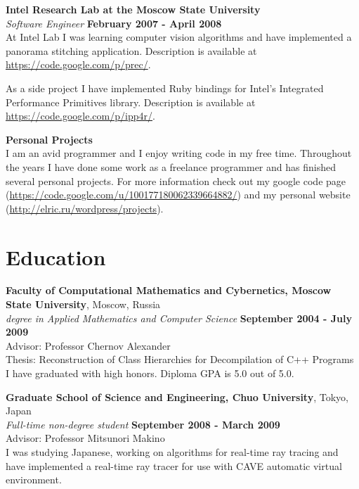 \documentclass[margin,line]{CV}
\begin{document}
\begin{resume}
    \pagebreak    
    
    \textbf{Intel Research Lab at the Moscow State University} \vspace{2mm}\\\vspace{1mm}%
    \textsl{Software Engineer} \hfill \textbf{February 2007 - April 2008}\\
    At Intel Lab I was learning computer vision algorithms and have implemented a panorama stitching application. Description is available at \url{https://code.google.com/p/prec/}.

    As a side project I have implemented Ruby bindings for Intel's Integrated Performance Primitives library. Description is available at \url{https://code.google.com/p/ipp4r/}.
    
    
	\textbf{Personal Projects} \vspace{2mm}\\\vspace{1mm}%
    I am an avid programmer and I enjoy writing code in my free time. Throughout the years I have done some work as a freelance programmer and has finished several personal projects. For more information check out my google code page (\url{https://code.google.com/u/100177180062339664882/}) and my personal website (\url{http://elric.ru/wordpress/projects}).
   
    
    \section{\mysidestyle Education}
    \textbf{Faculty of Computational Mathematics and Cybernetics, Moscow State University}, Moscow, Russia \vspace{2mm}\\\vspace{1mm}%
    \textsl{ degree in Applied Mathematics and Computer Science} \hfill \textbf{September 2004 - July 2009}\vspace{1mm}\\
    Advisor: Professor Chernov Alexander \\
    Thesis: Reconstruction of Class Hierarchies for Decompilation of C++ Programs \\
    I have graduated with high honors. Diploma GPA is 5.0 out of 5.0.

    \textbf{Graduate School of Science and Engineering, Chuo University}, Tokyo, Japan \vspace{2mm}\\\vspace{1mm}%
    \textsl{Full-time non-degree student} \hfill \textbf{September 2008 - March 2009}\vspace{1mm}\\
    Advisor: Professor Mitsunori Makino \\
	I was studying Japanese, working on algorithms for real-time ray tracing and have implemented a real-time ray tracer for use with CAVE automatic virtual environment.


\end{resume}
\end{document}
